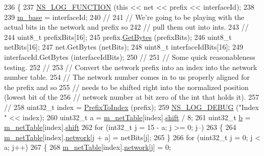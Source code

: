 \begin{DoxyCode}
236 \{
237   \hyperlink{log-macros-disabled_8h_a90b90d5bad1f39cb1b64923ea94c0761}{NS\_LOG\_FUNCTION} (\textcolor{keyword}{this} << net << prefix << interfaceId);
238 
239   \hyperlink{classns3_1_1Ipv6AddressGeneratorImpl_a1e53eb1183330c04ef0a0d81e3a3c21e}{m\_base} = interfaceId;
240   \textcolor{comment}{//}
241   \textcolor{comment}{// We're going to be playing with the actual bits in the network and prefix so}
242   \textcolor{comment}{// pull them out into ints.}
243   \textcolor{comment}{//}
244   uint8\_t prefixBits[16];
245   prefix.\hyperlink{classns3_1_1Ipv6Address_ab0584d5f11901b3a560be98afe358648}{GetBytes} (prefixBits);
246   uint8\_t netBits[16];
247   net.GetBytes (netBits);
248   uint8\_t interfaceIdBits[16];
249   interfaceId.GetBytes (interfaceIdBits);
250   \textcolor{comment}{//}
251   \textcolor{comment}{// Some quick reasonableness testing.}
252   \textcolor{comment}{//}
253   \textcolor{comment}{// Convert the network prefix into an index into the network number table.}
254   \textcolor{comment}{// The network number comes in to us properly aligned for the prefix and so}
255   \textcolor{comment}{// needs to be shifted right into the normalized position (lowest bit of the}
256   \textcolor{comment}{// network number at bit zero of the int that holds it).}
257   \textcolor{comment}{//}
258   uint32\_t index = \hyperlink{classns3_1_1Ipv6AddressGeneratorImpl_a0dbdd6e1547463c189a0e82251557e44}{PrefixToIndex} (prefix);
259   \hyperlink{group__logging_ga413f1886406d49f59a6a0a89b77b4d0a}{NS\_LOG\_DEBUG} (\textcolor{stringliteral}{"Index "} << index);
260   uint32\_t a = \hyperlink{classns3_1_1Ipv6AddressGeneratorImpl_a4b742848bb716936009880a429664323}{m\_netTable}[index].\hyperlink{classns3_1_1Ipv6AddressGeneratorImpl_1_1NetworkState_a959c55b3a4900a71975f7f5ea3b2d859}{shift} / 8;
261   uint32\_t \hyperlink{buildings__pathloss_8m_a21ad0bd836b90d08f4cf640b4c298e7c}{b} = \hyperlink{classns3_1_1Ipv6AddressGeneratorImpl_a4b742848bb716936009880a429664323}{m\_netTable}[index].\hyperlink{classns3_1_1Ipv6AddressGeneratorImpl_1_1NetworkState_a959c55b3a4900a71975f7f5ea3b2d859}{shift} %
262   \textcolor{keywordflow}{for} (int32\_t j = 15 - a; j >= 0; j--)
263     \{
264       \hyperlink{classns3_1_1Ipv6AddressGeneratorImpl_a4b742848bb716936009880a429664323}{m\_netTable}[index].\hyperlink{classns3_1_1Ipv6AddressGeneratorImpl_1_1NetworkState_ac84710d199384c02e953fd604fe34cee}{network}[j + a] = netBits[j];
265     \}
266   \textcolor{keywordflow}{for} (uint32\_t j = 0; j < a; j++)
267     \{
268       \hyperlink{classns3_1_1Ipv6AddressGeneratorImpl_a4b742848bb716936009880a429664323}{m\_netTable}[index].\hyperlink{classns3_1_1Ipv6AddressGeneratorImpl_1_1NetworkState_ac84710d199384c02e953fd604fe34cee}{network}[j] = 0;

\end{DoxyCode}
